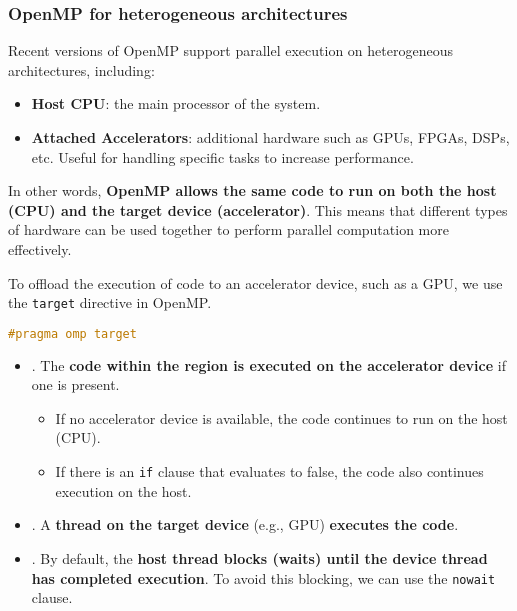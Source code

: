 \subsubsection{OpenMP for heterogeneous architectures}

Recent versions of OpenMP support parallel execution on heterogeneous architectures, including:
\begin{itemize}
    \item \textbf{Host CPU}: the main processor of the system.
    \item \textbf{Attached Accelerators}: additional hardware such as GPUs, FPGAs, DSPs, etc. Useful for handling specific tasks to increase performance.
\end{itemize}
In other words, \textbf{OpenMP allows the same code to run on both the host (CPU) and the target device (accelerator)}. This means that different types of hardware can be used together to perform parallel computation more effectively.

\highspace
To offload the execution of code to an accelerator device, such as a GPU, we use the \texttt{target} directive in OpenMP.
\begin{openmpbox}
    \begin{lstlisting}[language=C++]
#pragma omp target\end{lstlisting}
\end{openmpbox}
\begin{itemize}
    \item {}. The \textbf{code within the region is executed on the accelerator device} if one is present.
    \begin{itemize}
        \item If no accelerator device is available, the code continues to run on the host (CPU).
        \item If there is an \texttt{if} clause that evaluates to false, the code also continues execution on the host.
    \end{itemize}

    \item {}. A \textbf{thread on the target device} (e.g., GPU) \textbf{executes the code}.

    \item {}. By default, the \textbf{host thread blocks (waits) until the device thread has completed execution}. To avoid this blocking, we can use the \texttt{nowait} clause.
\end{itemize}


